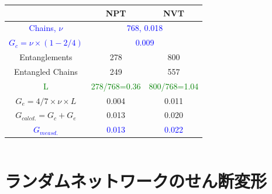 \documentclass[12pt, dvipdfmx]{beamer}
\begin{document}
\begin{frame}
\begin{columns}[onlytextwidth]
		\scriptsize
			\centering
			\begin{tabular}{c|c|c} \hline
				&NPT & NVT \\ \hline \hline
				\textcolor{blue}{Chains, $\nu$} & \multicolumn{2}{|c}{\textcolor{blue}{768, 0.018}}\\ \hline
				\textcolor{blue}{$G_c = \nu \times (1-2/4)$}&\multicolumn{2}{|c}{\textcolor{blue}{0.009}} \\ \hline \hline
				Entanglements& 278& 800\\ \hline
				Entangled Chains&249&557 \\ \hline
				\textcolor{green}{L} & \textcolor{green}{278/768=0.36} & \textcolor{green}{800/768=1.04} \\ \hline
				$G_e=4/7 \times \nu \times L $ & 0.004 & 0.011 \\ \hline \hline
				\alert{$G_{calcd.}=G_c + G_e$} & \alert{0.013} & \alert{0.020} \\ \hline \hline
				\textcolor{blue}{$G_{measd.}$} & \textcolor{blue}{0.013} & \textcolor{blue}{0.022} \\ \hline
			\end{tabular}
	\end{columns}
\end{frame}




\section{ランダムネットワークのせん断変形}
\end{document}
